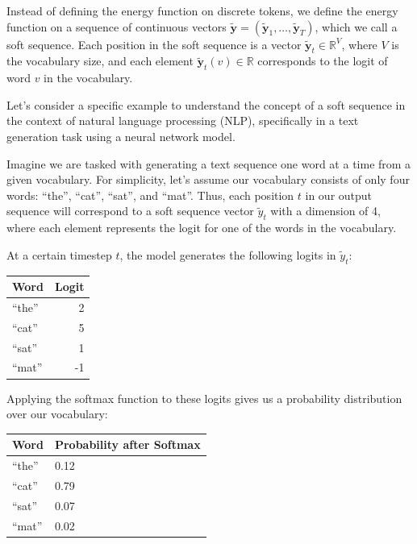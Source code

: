 \documentclass{article}
\newcommand{\quotes}[1]{``#1''}
\begin{document}
Instead of defining the energy function on discrete tokens, we define the energy function on a sequence of continuous vectors $\tilde{\boldsymbol{y}} = (\tilde{\boldsymbol{y}}_1, \ldots, \tilde{\boldsymbol{y}}_T)$, which we call a soft sequence. Each position in the soft sequence is a vector $\tilde{\boldsymbol{y}}_t \in \mathbb{R}^V$, where $V$ is the vocabulary size, and each element $\tilde{\boldsymbol{y}}_t(v) \in \mathbb{R}$ corresponds to the logit of word $v$ in the vocabulary.

Let's consider a specific example to understand the concept of a soft sequence in the context of natural language processing (NLP), specifically in a text generation task using a neural network model.

Imagine we are tasked with generating a text sequence one word at a time from a given vocabulary. For simplicity, let's assume our vocabulary consists of only four words: \quotes{the}, \quotes{cat}, \quotes{sat}, and \quotes{mat}. Thus, each position \(t\) in our output sequence will correspond to a soft sequence vector \(\tilde{y}_t\) with a dimension of 4, where each element represents the logit for one of the words in the vocabulary.

At a certain timestep \(t\), the model generates the following logits in \(\tilde{y}_t\):

\begin{center}
    \begin{tabular}{l r}
        \textbf{Word} & \textbf{Logit} \\
        \hline
        \quotes{the}  & 2              \\
        \quotes{cat}  & 5              \\
        \quotes{sat}  & 1              \\
        \quotes{mat}  & -1             \\
    \end{tabular}
\end{center}

Applying the softmax function to these logits gives us a probability distribution over our vocabulary:

\begin{center}
    \begin{tabular}{l p{2.5cm}} %
        \textbf{Word} & \textbf{Probability after Softmax} \\
        \hline
        \quotes{the}  & 0.12                               \\
        \quotes{cat}  & 0.79                               \\
        \quotes{sat}  & 0.07                               \\
        \quotes{mat}  & 0.02                               \\
    \end{tabular}
\end{center}
\end{document}
